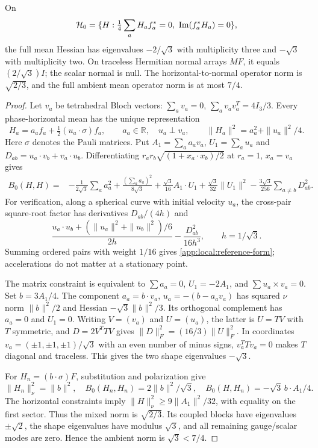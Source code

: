 \begin{lemma}\label{app:local:reference-spectrum}
On
\[
 \mathcal H_0=\{H:\tfrac14\sum_aH_af_a^*=0,\
                         \operatorname{Im}(f_a^*H_a)=0\},
\]
the full mean Hessian has eigenvalues $-2/\sqrt3$ with multiplicity three
and $-\sqrt3$ with multiplicity two. On traceless Hermitian normal
arrays $MF$, it equals $(2/\sqrt3)I$; the scalar normal is null.
The horizontal-to-normal operator norm is $\sqrt{2/3}$, and the full
ambient mean operator norm is at most $7/4$.
\end{lemma}
\begin{proof}
Let $v_a$ be tetrahedral Bloch vectors:
$\sum_av_a=0$, $\sum_av_av_a^T=4I_3/3$.
Every phase-horizontal mean has the unique representation
\[
 H_a=a_af_a+\tfrac12(u_a\cdot\sigma)f_a,\qquad
 a_a\in\mathbb R,\quad u_a\perp v_a,\qquad
 \|H_a\|^2=a_a^2+\|u_a\|^2/4.
\]
Here $\sigma$ denotes the Pauli matrices. Put
$A_1=\sum_aa_av_a$, $U_1=\sum_au_a$ and
$D_{ab}=u_a\cdot v_b+v_a\cdot u_b$.
Differentiating
$r_ar_b\sqrt{(1+x_a\cdot x_b)/2}$ at
$r_a=1$, $x_a=v_a$ gives
\begin{align}
 B_0(H,H)={}&-\frac1{2\sqrt3}\sum_aa_a^2
 +\frac{(\sum_aa_a)^2}{8\sqrt3}
 +\frac{\sqrt3}{16}A_1\cdot U_1
 +\frac{\sqrt3}{32}\|U_1\|^2
 -\frac{3\sqrt3}{256}\sum_{a\ne b}D_{ab}^2 .
 \label{app:local:reference-form}
\end{align}
For verification, along a spherical curve with initial velocity $u_a$,
the cross-pair square-root factor has derivatives
$D_{ab}/(4h)$ and
\[
 \frac{u_a\cdot u_b+(\|u_a\|^2+\|u_b\|^2)/6}{2h}
             -\frac{D_{ab}^2}{16h^3},\qquad h=1/\sqrt3.
\]
Summing ordered pairs with weight $1/16$ gives
\eqref{app:local:reference-form}; accelerations do not matter at a
stationary point.

The matrix constraint is equivalent to
$\sum a_a=0$, $U_1=-2A_1$, and $\sum u_a\times v_a=0$.
Set $b=3A_1/4$. The component
$a_a=b\cdot v_a$, $u_a=-(b-a_av_a)$ has squared $\nu$ norm
$\|b\|^2/2$ and Hessian $-\sqrt3\|b\|^2/3$.
Its orthogonal complement has $a_a=0$ and $U_1=0$.
Writing $V=(v_a)$ and $U=(u_a)$, the latter is $U=TV$ with $T$ symmetric,
and $D=2V^TTV$ gives $\|D\|_F^2=(16/3)\|U\|_F^2$.
In coordinates $v_a=(\pm1,\pm1,\pm1)/\sqrt3$ with an even number of
minus signs, $v_a^TTv_a=0$ makes $T$ diagonal and traceless.
This gives the two shape eigenvalues $-\sqrt3$.

For $H_n=(b\cdot\sigma)F$, substitution and polarization give
\[
 \|H_n\|_\nu^2=\|b\|^2,\quad
 B_0(H_n,H_n)=2\|b\|^2/\sqrt3,\quad
 B_0(H,H_n)=-\sqrt3\,b\cdot A_1/4 .
\]
The horizontal constraints imply
$\|H\|_\nu^2\ge9\|A_1\|^2/32$, with equality on the first sector.
Thus the mixed norm is $\sqrt{2/3}$. Its coupled blocks have eigenvalues
$\pm\sqrt2$, the shape eigenvalues have modulus $\sqrt3$, and all
remaining gauge/scalar modes are zero. Hence the ambient norm is
$\sqrt3<7/4$.
\end{proof}

